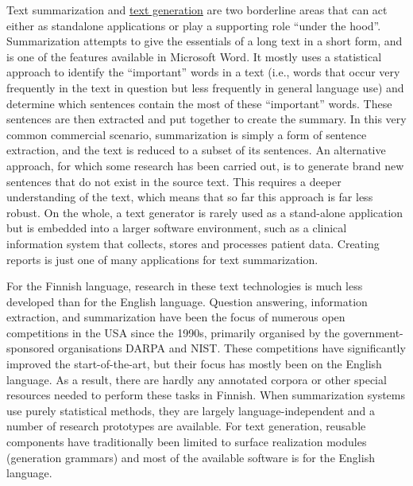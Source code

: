 \documentclass{../../metanetpaper}
\begin{document}
\begin{Parallel}[c]{79mm}{78mm}
{Text summarization and \underline{text generation} are two borderline areas that can act
either as standalone applications or play a supporting role “under the hood”.
Summarization attempts to give the essentials of a long text in a short form,
and is one of the features available in Microsoft Word. It mostly uses a
statistical approach to identify the “important” words in a text (i.e., words
that occur very frequently in the text in question but less frequently in
general language use) and determine which sentences contain the most of these
“important” words. These sentences are then extracted and put together to
create the summary. In this very common commercial scenario, summarization is
simply a form of sentence extraction, and the text is reduced to a subset of
its sentences. An alternative approach, for which some research has been
carried out, is to generate brand new sentences that do not exist in the source
text. This requires a deeper understanding of the text, which means that so far
this approach is far less robust. On the whole, a text generator is rarely used
as a stand-alone application but is embedded into a larger software
environment, such as a clinical information system that collects, stores and
processes patient data. Creating reports is just one of many applications for
text summarization.

For the Finnish language, research in these text technologies is much
less developed than for the English language. Question answering,
information extraction, and summarization have been the focus of
numerous open competitions in the USA since the 1990s, primarily
organised by the government-sponsored organisations DARPA and
NIST. These competitions have significantly improved the
start-of-the-art, but their focus has mostly been on the English
language.  As a result, there are hardly any annotated corpora or
other special resources needed to perform these tasks in Finnish. When
summarization systems use purely statistical methods, they are largely
language-independent and a number of research prototypes are
available. For text generation, reusable components have traditionally
been limited to surface realization modules (generation grammars) and
most of the available software is for the English language.  }

\ParallelPar



\end{Parallel}
\end{document}
